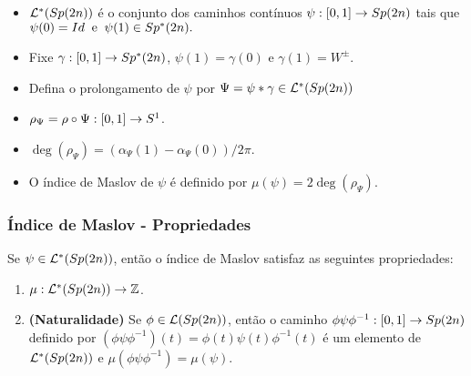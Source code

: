 \documentclass{beamer}
\begin{document}
\begin{footnotesize}
\begin{frame}
\begin{scriptsize}
\begin{minipage}[t]{0.3\linewidth}
				
			\end{minipage}
			
			\begin{definicao}
				
				\begin{itemize}
					\item $
					\mathcal{L}^{*}(Sp(2n))$ é o conjunto dos caminhos contínuos $ \psi : [0,1] \to Sp(2n)$ tais que $\psi(0)=Id \;\; \text{e}\;\; \psi(1)\in Sp^{*}(2n).
					$
					
					\item Fixe $\gamma :[0,1] \to Sp^{*}(2n)$, $\psi(1)=\gamma(0)$ e $\gamma(1)=W^{\pm}$. 
					
					\item Defina o prolongamento de $\psi$ por $\Psi = \psi*\gamma \in   \mathcal{L}^{*}(Sp(2n))$ 
					
					\item $\rho_{\Psi} = \rho \circ \Psi:[0,1]\to S^{1}$.
					
					\item $\deg(\rho_{\Psi}) = (\alpha_{\Psi}(1)-\alpha_{\Psi}(0))/2\pi$. 
					
					\item 	O índice de Maslov de $\psi$ é definido por
					$\mu(\psi)= 2\deg(\rho_{\Psi})$.
				\end{itemize}
			\end{definicao}
		\end{scriptsize}
		
		\end{frame}
	
	
	\begin{frame}			
		\frametitle{Índice de Maslov - Propriedades}
		
		\begin{teorema}
			Se $\psi \in \mathcal{L}^{*}(Sp(2n))$, então o índice de Maslov satisfaz as seguintes propriedades:
			\begin{enumerate}
				\item $\mu:\mathcal{L}^{*}(Sp(2n)) \to \mathbb{Z}$.
				
				\item \textbf{(Naturalidade)}\label{item_naturalidade_maslov} Se $\phi\in \mathcal{L}(Sp(2n))$, então o caminho $\phi\psi\phi^{-1}: [0,1] \to Sp(2n)$ definido por $(\phi\psi\phi^{-1})(t) = \phi(t)\psi(t)\phi^{-1}(t)$ é um elemento de $\mathcal{L}^{*}(Sp(2n))$ e $\mu(\phi\psi\phi^{-1}) = \mu(\psi)$.
				

\end{enumerate}
\end{teorema}
\end{frame}
\end{footnotesize}
\end{document}
